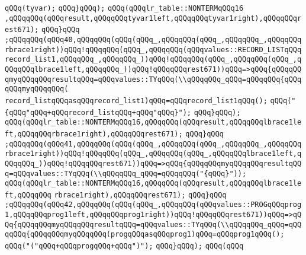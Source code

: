 \verb|qQQq(tyvar);|\newline
\verb|qQQq}qQQq);|\newline
\verb|qQQq(qQQqlr_table::NONTERMqQQq16|\newline
\verb|,qQQqqQQq(qQQqresult,qQQqqQQqtyvar1left,qQQqqQQqtyvar1right),qQQqqQQqrest671);|\newline
\verb|qQQq}qQQq|\newline
\verb|;qQQqqQQq(qQQq40,qQQqqQQq(qQQq(qQQq_,qQQqqQQq(qQQq_,qQQqqQQq_,qQQqqQQqrbrace1right))qQQq!qQQqqQQq(qQQq_,qQQqqQQq(qQQqvalues::RECORD_LISTqQQqrecord_list1,qQQqqQQq_,qQQqqQQq_))qQQq!qQQqqQQq(qQQq_,qQQqqQQq(qQQq_,qQQqqQQqlbrace1left,qQQqqQQq_))qQQq!qQQqqQQqrest671))qQQq=>qQQq{qQQqqQQqmyqQQqqQQqresultqQQq=qQQqvalues::TYqQQq(\\qQQqqQQq_qQQq=qQQqqQQq{qQQqqQQqmyqQQqqQQq(|\newline
\verb|record_listqQQqasqQQqrecord_list1)qQQq=qQQqrecord_list1qQQq();|\newline
\verb|qQQq("{qQQq"qQQq+qQQqrecord_listqQQq+qQQq"qQQq}");|\newline
\verb|qQQq}qQQq);|\newline
\verb|qQQq(qQQqlr_table::NONTERMqQQq16,qQQqqQQq(qQQqresult,qQQqqQQqlbrace1left,qQQqqQQqrbrace1right),qQQqqQQqrest671);|\newline
\verb|qQQq}qQQq|\newline
\verb|;qQQqqQQq(qQQq41,qQQqqQQq(qQQq(qQQq_,qQQqqQQq(qQQq_,qQQqqQQq_,qQQqqQQqrbrace1right))qQQq!qQQqqQQq(qQQq_,qQQqqQQq(qQQq_,qQQqqQQqlbrace1left,qQQqqQQq_))qQQq!qQQqqQQqrest671))qQQq=>qQQq{qQQqqQQqmyqQQqqQQqresultqQQq=qQQqvalues::TYqQQq(\\qQQqqQQq_qQQq=qQQqqQQq("{qQQq}"));|\newline
\verb|qQQq(qQQqlr_table::NONTERMqQQq16,qQQqqQQq(qQQqresult,qQQqqQQqlbrace1left,qQQqqQQq|\newline
\verb|rbrace1right),qQQqqQQqrest671);|\newline
\verb|qQQq}qQQq|\newline
\verb|;qQQqqQQq(qQQq42,qQQqqQQq(qQQq(qQQq_,qQQqqQQq(qQQqvalues::PROGqQQqprog1,qQQqqQQqprog1left,qQQqqQQqprog1right))qQQq!qQQqqQQqrest671))qQQq=>qQQq{qQQqqQQqmyqQQqqQQqresultqQQq=qQQqvalues::TYqQQq(\\qQQqqQQq_qQQq=qQQqqQQq{qQQqqQQqmyqQQqqQQq(progqQQqasqQQqprog1)qQQq=qQQqprog1qQQq();|\newline
\verb|qQQq("("qQQq+qQQqprogqQQq+qQQq")");|\newline
\verb|qQQq}qQQq);|\newline
\verb|qQQq(qQQq|\newline
